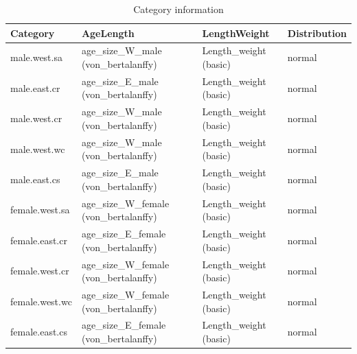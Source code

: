\documentclass[
]{book}
\newenvironment{Shaded}{\begin{snugshade}}{\end{snugshade}}
\newcommand{\AttributeTok}[1]{\textcolor[rgb]{0.77,0.63,0.00}{#1}}
\newcommand{\FunctionTok}[1]{\textcolor[rgb]{0.00,0.00,0.00}{#1}}
\newcommand{\NormalTok}[1]{#1}
\newcommand{\SpecialCharTok}[1]{\textcolor[rgb]{0.00,0.00,0.00}{#1}}
\newcommand{\StringTok}[1]{\textcolor[rgb]{0.31,0.60,0.02}{#1}}
\begin{document}
\begin{table}

\caption{\label{tab:categories}Category information}
\centering
\begin{tabular}[t]{l|l|l|l}
\hline
Category & AgeLength & LengthWeight & Distribution\\
\hline
male.west.sa & age\_size\_W\_male (von\_bertalanffy) & Length\_weight (basic) & normal\\
\hline
male.east.cr & age\_size\_E\_male (von\_bertalanffy) & Length\_weight (basic) & normal\\
\hline
male.west.cr & age\_size\_W\_male (von\_bertalanffy) & Length\_weight (basic) & normal\\
\hline
male.west.wc & age\_size\_W\_male (von\_bertalanffy) & Length\_weight (basic) & normal\\
\hline
male.east.cs & age\_size\_E\_male (von\_bertalanffy) & Length\_weight (basic) & normal\\
\hline
female.west.sa & age\_size\_W\_female (von\_bertalanffy) & Length\_weight (basic) & normal\\
\hline
female.east.cr & age\_size\_E\_female (von\_bertalanffy) & Length\_weight (basic) & normal\\
\hline
female.west.cr & age\_size\_W\_female (von\_bertalanffy) & Length\_weight (basic) & normal\\
\hline
female.west.wc & age\_size\_W\_female (von\_bertalanffy) & Length\_weight (basic) & normal\\
\hline
female.east.cs & age\_size\_E\_female (von\_bertalanffy) & Length\_weight (basic) & normal\\
\hline
\end{tabular}
\end{table}

\begin{Shaded}
\end{Shaded}
\end{document}
